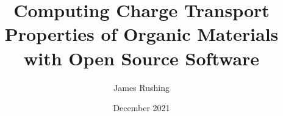 \documentclass[12pt]{report}
\begin{document}
\author{James Rushing}
\title{Computing Charge Transport Properties of 
Organic Materials with Open Source Software} %
\date{December 2021}
\maketitle
\makecopyright
\submittalsheet
\setcounter{page}{4}
%

%

\tableofcontents
\end{document}
